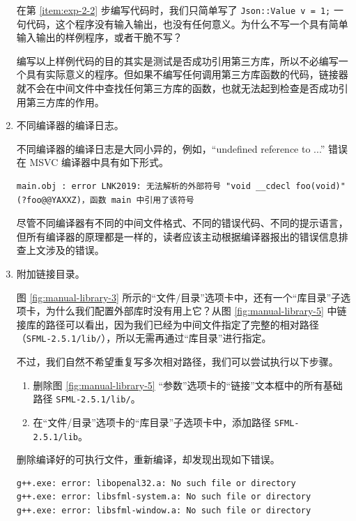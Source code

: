 \begin{enumerate}
	在第 \ref{item:exp-2-2} 步编写代码时，我们只简单写了 \lstinline[language={[17]C++}, moreemph={[1]Value}]{Json::Value v = 1;} 一句代码，这个程序没有输入输出，也没有任何意义。为什么不写一个具有简单输入输出的样例程序，或者干脆不写？

	编写以上样例代码的目的其实是测试是否成功引用第三方库，所以不必编写一个具有实际意义的程序。但如果不编写任何调用第三方库函数的代码，链接器就不会在中间文件中查找任何第三方库的函数，也就无法起到检查是否成功引用第三方库的作用。

	\item 不同编译器的编译日志。

	不同编译器的编译日志是大同小异的，例如，“undefined reference to ...” 错误在 MSVC 编译器中具有如下形式。

	\begin{lstlisting}[language={}]
main.obj : error LNK2019: 无法解析的外部符号 "void __cdecl foo(void)" (?foo@@YAXXZ)，函数 main 中引用了该符号
	\end{lstlisting}

	尽管不同编译器有不同的中间文件格式、不同的错误代码、不同的提示语言，但所有编译器的原理都是一样的，读者应该主动根据编译器报出的错误信息排查上文涉及的错误。

	\item 附加链接目录。

	图 \ref{fig:manual-library-3} 所示的“文件/目录”选项卡中，还有一个“库目录”子选项卡，为什么我们配置外部库时没有用上它？从图 \ref{fig:manual-library-5} 中链接库的路径可以看出，因为我们已经为中间文件指定了完整的相对路径（\lstinline[language={}]{SFML-2.5.1/lib/}），所以无需再通过“库目录”进行指定。

	不过，我们自然不希望重复写多次相对路径，我们可以尝试执行以下步骤。

	\begin{enumerate}
		\item 删除图 \ref{fig:manual-library-5} “参数”选项卡的“链接”文本框中的所有基础路径 \lstinline[language={}]{SFML-2.5.1/lib/}。
		\item 在“文件/目录”选项卡的“库目录”子选项卡中，添加路径 \lstinline[language={}]{SFML-2.5.1/lib}。
	\end{enumerate}

	删除编译好的可执行文件，重新编译，却发现出现如下错误。

	\begin{lstlisting}[language={}]
g++.exe: error: libopenal32.a: No such file or directory
g++.exe: error: libsfml-system.a: No such file or directory
g++.exe: error: libsfml-window.a: No such file or directory
	\end{lstlisting}


\end{enumerate}
